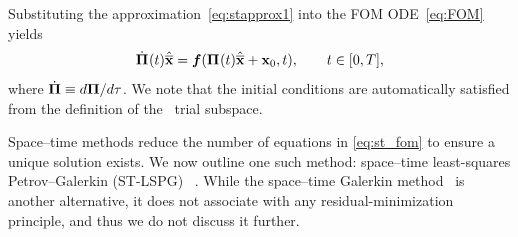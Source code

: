 \documentclass[3p,computermodern,10pt]{elsarticle}
\begin{document}
Substituting the approximation~\eqref{eq:stapprox1} into the FOM
ODE~\eqref{eq:FOM} yields
\begin{equation}\label{eq:st_fom}
\dot{\boldsymbol \Pi}^{}(t) \hat{\mathbf{\overline{x}}} =  \boldsymbol f(\boldsymbol \Pi^{}(t) \hat{\mathbf{\overline{x}}} +
	{{\mathbf{x}}_0},t) , \qquad t \in [0,T],
\end{equation}
where 
$\dot{\boldsymbol \Pi}\equiv d\boldsymbol \Pi/d\tau$. We note that the initial conditions
are automatically satisfied from the definition of the \spaceTimeAcronym\
trial subspace.

Space--time methods reduce the number of equations in
\eqref{eq:st_fom} to ensure a unique solution exists.
We now outline one such method: space--time least-squares Petrov--Galerkin (ST-LSPG)
~\cite{choi_stlspg}. 
While the space--time Galerkin method~\cite{benner_st} is another alternative, it does not
associate with any residual-minimization principle, and thus we do not discuss
it further.
\end{document}
